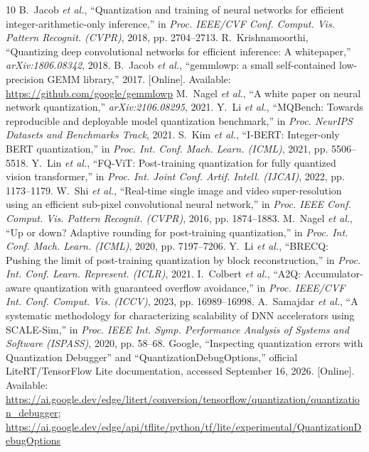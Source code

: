 \documentclass[11pt,a4paper,oneside]{report}
\begin{document}
\begin{thebibliography}{10}
 B.~Jacob \emph{et al.}, ``Quantization and training of neural networks for efficient
integer-arithmetic-only inference,'' in \emph{Proc. IEEE/CVF Conf. Comput. Vis. Pattern Recognit. (CVPR)},
2018, pp. 2704--2713.
 R.~Krishnamoorthi, ``Quantizing deep convolutional networks for efficient
inference: A whitepaper,'' \emph{arXiv:1806.08342}, 2018.
 B.~Jacob \emph{et al.}, ``gemmlowp: a small self-contained low-precision GEMM library,''
2017. [Online]. Available: \url{https://github.com/google/gemmlowp}
 M.~Nagel \emph{et al.}, ``A white paper on neural network quantization,''
\emph{arXiv:2106.08295}, 2021.
 Y.~Li \emph{et al.}, ``MQBench: Towards reproducible and deployable model quantization
benchmark,'' in \emph{Proc. NeurIPS Datasets and Benchmarks Track}, 2021.
 S.~Kim \emph{et al.}, ``I-BERT: Integer-only BERT quantization,'' in \emph{Proc. Int. Conf.
Mach. Learn. (ICML)}, 2021, pp. 5506--5518.
 Y.~Lin \emph{et al.}, ``FQ-ViT: Post-training quantization for fully quantized vision
transformer,'' in \emph{Proc. Int. Joint Conf. Artif. Intell. (IJCAI)}, 2022, pp. 1173--1179.
 W.~Shi \emph{et al.}, ``Real-time single image and video super-resolution using an efficient
sub-pixel convolutional neural network,'' in \emph{Proc. IEEE Conf. Comput. Vis. Pattern Recognit. (CVPR)},
2016, pp. 1874--1883.
 M.~Nagel \emph{et al.}, ``Up or down? Adaptive rounding for post-training quantization,''
in \emph{Proc. Int. Conf. Mach. Learn. (ICML)}, 2020, pp. 7197--7206.
 Y.~Li \emph{et al.}, ``BRECQ: Pushing the limit of post-training quantization by block
reconstruction,'' in \emph{Proc. Int. Conf. Learn. Represent. (ICLR)}, 2021.
 I.~Colbert \emph{et al.}, ``A2Q: Accumulator-aware quantization with guaranteed overflow
avoidance,'' in \emph{Proc. IEEE/CVF Int. Conf. Comput. Vis. (ICCV)}, 2023, pp. 16989--16998.
 A.~Samajdar \emph{et al.}, ``A systematic methodology for characterizing scalability of DNN
accelerators using SCALE-Sim,'' in \emph{Proc. IEEE Int. Symp. Performance Analysis of Systems and Software
(ISPASS)}, 2020, pp. 58--68.
 Google, ``Inspecting quantization errors with Quantization Debugger'' and
``QuantizationDebugOptions,'' official LiteRT/TensorFlow Lite documentation, accessed September 16, 2026.
[Online]. Available: \url{https://ai.google.dev/edge/litert/conversion/tensorflow/quantization/quantization_debugger};
\url{https://ai.google.dev/edge/api/tflite/python/tf/lite/experimental/QuantizationDebugOptions}
\end{thebibliography}
\end{document}
